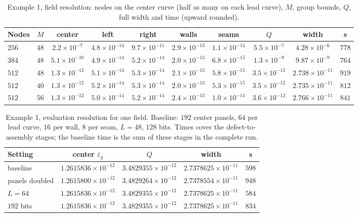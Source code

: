 \begin{table}[tbhp]
\caption{Example 1, field resolution: nodes on the center curve (half as many
on each lead curve), $M$,
group bounds, $Q$, full width and time (upward rounded).}
\label{sm:tab-resolution}
\centering\scriptsize\setlength{\tabcolsep}{1.5pt}
\begin{tabular}{lccccccccc}
\toprule
Nodes & $M$ & center & left & right & walls & seams & $Q$ & width & s\\
\midrule
$256$ & $48$ & $2.2\times10^{-7}$ & $4.8\times10^{-14}$ & $9.7\times10^{-11}$ & $2.9\times10^{-13}$ & $1.1\times10^{-14}$ & $5.5\times10^{-7}$ & $4.28\times10^{-6}$ & $778$\\
$384$ & $48$ & $5.1\times10^{-10}$ & $4.9\times10^{-14}$ & $5.2\times10^{-14}$ & $2.0\times10^{-13}$ & $6.8\times10^{-15}$ & $1.3\times10^{-9}$ & $9.87\times10^{-9}$ & $764$\\
$512$ & $48$ & $1.3\times10^{-12}$ & $5.1\times10^{-14}$ & $5.3\times10^{-14}$ & $2.1\times10^{-13}$ & $5.8\times10^{-15}$ & $3.5\times10^{-12}$ & $2.738\times10^{-11}$ & $919$\\
$512$ & $40$ & $1.3\times10^{-12}$ & $5.2\times10^{-14}$ & $5.3\times10^{-14}$ & $2.0\times10^{-13}$ & $5.3\times10^{-15}$ & $3.5\times10^{-12}$ & $2.735\times10^{-11}$ & $812$\\
$512$ & $56$ & $1.3\times10^{-12}$ & $5.0\times10^{-14}$ & $5.2\times10^{-14}$ & $2.4\times10^{-13}$ & $1.0\times10^{-14}$ & $3.6\times10^{-12}$ & $2.766\times10^{-11}$ & $841$\\
\bottomrule
\end{tabular}
\end{table}

\begin{table}[tbhp]
\caption{Example 1, evaluation resolution for one field. Baseline: $192$ center
panels, $64$ per lead curve, $16$ per wall, $8$ per seam, $L=48$, $128$ bits. Times
cover the defect-to-assembly stages; the baseline time is the sum of these stages in
the complete run.}
\label{sm:tab-eval}
\centering\small
\begin{tabular}{lcccc}
\toprule
Setting & center $\overline\varepsilon_g$ & $Q$ & width & s\\
\midrule
baseline & $1.2615836\times10^{-12}$ & $3.4829355\times10^{-12}$ & $2.7378625\times10^{-11}$ & $598$\\
panels doubled & $1.2615800\times10^{-12}$ & $3.4829264\times10^{-12}$ & $2.7378554\times10^{-11}$ & $948$\\
$L=64$ & $1.2615836\times10^{-12}$ & $3.4829355\times10^{-12}$ & $2.7378625\times10^{-11}$ & $584$\\
$192$ bits & $1.2615836\times10^{-12}$ & $3.4829355\times10^{-12}$ & $2.7378625\times10^{-11}$ & $834$\\
\bottomrule
\end{tabular}
\end{table}

